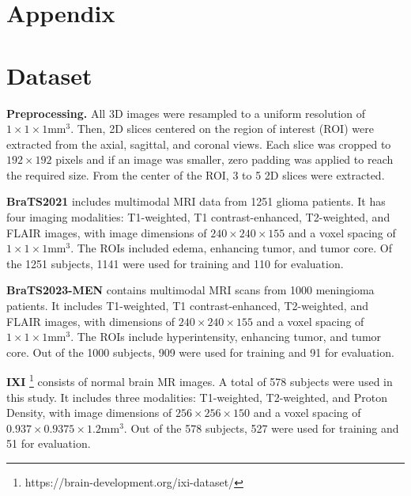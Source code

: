 
\clearpage
\appendix

\setlength{\abovedisplayskip}{\baselineskip}
\setlength{\belowdisplayskip}{\baselineskip}
\renewcommand{\thesection}{\Alph{section}}
\setcounter{section}{0}
\setcounter{footnote}{0}

\onecolumn

\section{Appendix}

\section{Dataset}
\label{sec:A}

\noindent \textbf{Preprocessing.} All 3D images were resampled to a uniform resolution of $1\times1\times1 \text{mm}^3$. Then, 2D slices centered on the region of interest (ROI) were extracted from the axial, sagittal, and coronal views. Each slice was cropped to $192\times192$ pixels and if an image was smaller, zero padding was applied to reach the required size.  From the center of the ROI, 3 to 5 2D slices were extracted.

\vspace{3pt}
\noindent \textbf{BraTS2021} \cite{baid2021rsna} includes multimodal MRI data from 1251 glioma patients. It  has four imaging modalities: T1-weighted, T1 contrast-enhanced, T2-weighted, and FLAIR images, with image dimensions of $240\times240\times155$ and a voxel spacing of $1\times1\times1 \text{mm}^3$. The ROIs included edema, enhancing tumor, and tumor core. Of the 1251 subjects, 1141 were used for training and 110 for evaluation.

\vspace{3pt}
\noindent \textbf{BraTS2023-MEN} \cite{labella2023asnrmiccai} contains multimodal MRI scans from 1000 meningioma patients. It includes T1-weighted, T1 contrast-enhanced, T2-weighted, and FLAIR images, with dimensions of $240\times240\times155$ and a voxel spacing of $1\times1\times1 \text{mm}^3$. The ROIs include hyperintensity, enhancing tumor, and tumor core. Out of the 1000 subjects, 909 were used for training and 91 for evaluation.

\vspace{3pt}
\noindent \textbf{IXI} \footnote{https://brain-development.org/ixi-dataset/} consists of normal brain MR images. A total of 578 subjects were used in this study. It includes three modalities: T1-weighted, T2-weighted, and Proton Density, with image dimensions of $256\times256\times150$ and a voxel spacing of $0.937\times0.9375\times1.2 \text{mm}^3$. Out of the 578 subjects, 527 were used for training and 51 for evaluation.

